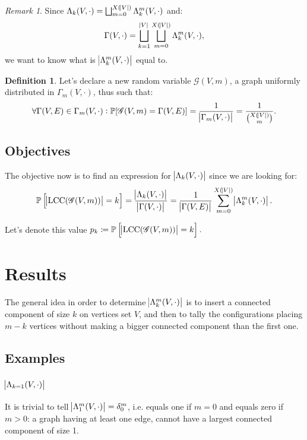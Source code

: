\documentclass{article}
\theoremstyle{definition}
\newtheorem{definition}[lemma]{Definition}
\theoremstyle{remark}
\newtheorem*{remark}{Remark}
\DeclareMathOperator{\LCC}{LCC}
\renewcommand{\P}{\mathbb P}
\begin{document}
		\begin{remark} Since $\Lambda_k(V, \cdot) = \bigsqcup_{m=0}^{X(\abs V)}\Lambda_k^m(V, \cdot)$ and:
		\[\Gamma(V, \cdot) = \bigsqcup_{k=1}^{\abs V}\bigsqcup_{m=0}^{X(\abs V)}\Lambda_k^m(V, \cdot),\]
		we want to know what is $\abs {\Lambda_k^m(V, \cdot)}$ equal to.
		\end{remark}

		\begin{definition} Let's declare a new random variable $\mathscr G(V, m)$, a graph uniformly distributed in $\Gamma_m(V, \cdot)$, thus such that:
		\[\forall \Gamma(V, E) \in \Gamma_m(V, \cdot) : \P[\mathscr G(V, m) = \Gamma(V, E)] = \frac 1{\abs {\Gamma_m(V, \cdot)}} = \frac 1{\binom {X(\abs V)}m}.\]
		\end{definition}

	\subsection{Objectives}
		The objective now is to find an expression for $\abs {\Lambda_k(V, \cdot)}$ since we are looking for:
		\[\P\left[\abs {\LCC(\mathscr G(V, m))} = k\right] = \frac {\abs {\Lambda_k(V, \cdot)}}{\abs {\Gamma(V, \cdot)}}
			= \frac 1{\abs {\Gamma(V, E)}}\sum_{m=0}^{X(\abs V)}\abs {\Lambda_k^m(V, \cdot)}.\]

		Let's denote this value $p_k \coloneqq \P\left[\abs {\LCC(\mathscr G(V, m))} = k\right].$

\section{Results}\label{sec:results}
	The general idea in order to determine $\abs {\Lambda_k^m(V, \cdot)}$ is to insert a connected component of size $k$ on vertices set $V$, and then to tally the configurations
	placing $m-k$ vertices without making a bigger connected component than the first one.

	\subsection{Examples}
		\subsubsection{$\abs {\Lambda_{k=1}(V, \cdot)}$}
			It is trivial to tell $\abs {\Lambda_1^m(V, \cdot)} = \delta_0^m$, i.e. equals one if $m=0$ and equals zero if $m>0$: a graph having at least one edge, cannot have
			a largest connected component of size 1.
\end{document}
